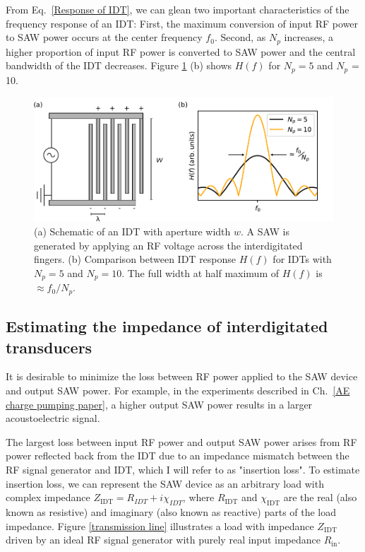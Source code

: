 \documentclass{beavtex_dub_edit}
\begin{document}
From Eq.\ \ref{Response of IDT}, we can glean two important characteristics of the frequency response of an IDT: First, the maximum conversion of input RF power to SAW power occurs at the center frequency $f_0$. Second, as $N_p$ increases, a higher proportion of input RF power is converted to SAW power and the central bandwidth of the IDT decreases. Figure \ref{SAW diagram} (b) shows $H(f)$ for $N_p = 5$ and $N_p$ = 10.

\begin{figure}
    \includegraphics[width = 1\textwidth]{SAW diagram.pdf}
    \caption{(a) Schematic of an IDT with aperture width $w$. A SAW is generated by applying an RF voltage across the interdigitated fingers. (b) Comparison between IDT response $H(f)$ for IDTs with $N_p = 5$ and $N_p = 10$. The full width at half maximum of $H(f)$ is $\approx f_0/N_p$.}
    \label{SAW diagram}
\end{figure}


\subsection{Estimating the impedance of interdigitated transducers}

It is desirable to minimize the loss between RF power applied to the SAW device and output SAW power. For example, in the experiments described in Ch.\ \ref{AE charge pumping paper}, a higher output SAW power results in a larger acoustoelectric signal. 

The largest loss between input RF power and output SAW power arises from RF power reflected back from the IDT due to an impedance mismatch between the RF signal generator and IDT, which I will refer to as "insertion loss". To estimate insertion loss, we can represent the SAW device as an arbitrary load with complex impedance $Z_{\mathrm{IDT}} = R_{IDT} + i\chi_{IDT}$, where $R_{\mathrm{IDT}}$ and $\chi_{\mathrm{IDT}}$ are the real (also known as resistive) and imaginary (also known as reactive) parts of the load impedance. Figure \ref{transmission line} illustrates a load with impedance $Z_{\mathrm{IDT}}$ driven by an ideal RF signal generator with purely real input impedance $R_{\mathrm{in}}$.
\end{document}
